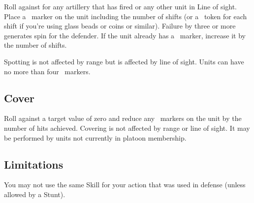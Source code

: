 Roll  against  for any artillery that has fired or any other unit in Line of sight. Place a \SPOTTED\ marker on the unit including the number of shifts (or a \SPOTTED\ token for each shift if you're using glass beads or coins or similar). Failure by three or more generates spin for the defender. If the unit already has a \SPOTTED\ marker, increase it by the number of shifts.



Spotting is not affected by range but is affected by line of sight. Units can have no more than four \SPOTTED\ markers.

\subsection{Cover}\label{sec:platoon-combat-cover}

Roll  against a target value of zero and reduce any \SPOTTED\ markers on the unit by the number of hits achieved. Covering is not affected by range or line of sight. It may be performed by units not currently in platoon membership.

\subsection{Limitations}\label{sec:platoon-combat-limitations}

You may not use the same Skill for your action that was used in defense (unless allowed by a Stunt).


